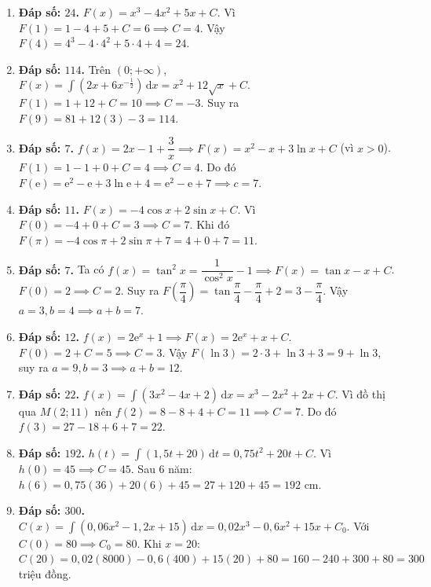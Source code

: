 \documentclass[12pt,a4paper]{article}
\begin{document}
\begin{enumerate}[start=21]
\item \textbf{Đáp số: $24$.}  
$F(x) = x^3 - 4x^2 + 5x + C$. Vì $F(1) = 1 - 4 + 5 + C = 6 \implies C = 4$.  
Vậy $F(4) = 4^3 - 4\cdot 4^2 + 5\cdot 4 + 4 = 24$.

\item \textbf{Đáp số: $114$.}  
Trên $(0; +\infty)$, $F(x) = \int \left(2x + 6x^{-\frac{1}{2}}\right)\,\mathrm{d}x = x^2 + 12\sqrt{x} + C$.  
$F(1) = 1 + 12 + C = 10 \implies C = -3$. Suy ra $F(9) = 81 + 12(3) - 3 = 114$.

\item \textbf{Đáp số: $7$.}  
$f(x) = 2x - 1 + \dfrac{3}{x} \implies F(x) = x^2 - x + 3\ln x + C$ (vì $x > 0$).  
$F(1) = 1 - 1 + 0 + C = 4 \implies C = 4$.  
Do đó $F(\mathrm{e}) = \mathrm{e}^2 - \mathrm{e} + 3\ln\mathrm{e} + 4 = \mathrm{e}^2 - \mathrm{e} + 7 \implies c = 7$.

\item \textbf{Đáp số: $11$.}  
$F(x) = -4\cos x + 2\sin x + C$. Vì $F(0) = -4 + 0 + C = 3 \implies C = 7$.  
Khi đó $F(\pi) = -4\cos\pi + 2\sin\pi + 7 = 4 + 0 + 7 = 11$.

\item \textbf{Đáp số: $7$.}  
Ta có $f(x) = \tan^2 x = \dfrac{1}{\cos^2 x} - 1 \implies F(x) = \tan x - x + C$.  
$F(0) = 2 \implies C = 2$. Suy ra $F\!\left(\dfrac{\pi}{4}\right) = \tan\dfrac{\pi}{4} - \dfrac{\pi}{4} + 2 = 3 - \dfrac{\pi}{4}$.  
Vậy $a = 3, b = 4 \implies a + b = 7$.

\item \textbf{Đáp số: $12$.}  
$f(x) = 2\mathrm{e}^x + 1 \implies F(x) = 2\mathrm{e}^x + x + C$.  
$F(0) = 2 + C = 5 \implies C = 3$. Vậy $F(\ln 3) = 2\cdot 3 + \ln 3 + 3 = 9 + \ln 3$, suy ra $a = 9, b = 3 \implies a + b = 12$.

\item \textbf{Đáp số: $22$.}  
$f(x) = \int (3x^2 - 4x + 2)\,\mathrm{d}x = x^3 - 2x^2 + 2x + C$.  
Vì đồ thị qua $M(2; 11)$ nên $f(2) = 8 - 8 + 4 + C = 11 \implies C = 7$.  
Do đó $f(3) = 27 - 18 + 6 + 7 = 22$.

\item \textbf{Đáp số: $192$.}  
$h(t) = \int (1{,}5t + 20)\,\mathrm{d}t = 0{,}75t^2 + 20t + C$.  
Vì $h(0) = 45 \implies C = 45$. Sau $6$ năm: $h(6) = 0{,}75(36) + 20(6) + 45 = 27 + 120 + 45 = 192\text{ cm}$.

\item \textbf{Đáp số: $300$.}  
$C(x) = \int (0{,}06x^2 - 1{,}2x + 15)\,\mathrm{d}x = 0{,}02x^3 - 0{,}6x^2 + 15x + C_0$.  
Với $C(0) = 80 \implies C_0 = 80$. Khi $x = 20$:  
$C(20) = 0{,}02(8000) - 0{,}6(400) + 15(20) + 80 = 160 - 240 + 300 + 80 = 300$ triệu đồng.


\end{enumerate}
\end{document}
